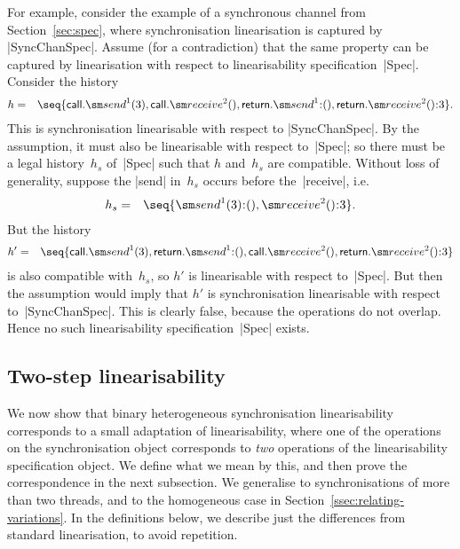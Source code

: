 For example, consider the example of a synchronous channel from
Section~\ref{sec:spec}, where synchronisation linearisation is captured by
|SyncChanSpec|.  Assume (for a contradiction) that the same property can be
captured by linearisation with respect to linearisability
specification~|Spec|.  Consider the history
\begin{eqnarray*}
h & = & \seq{ 
  \call.\send^1(3), \call.\receive^2(), 
  \return.\send^1\::(), \return.\receive^2()\::3 }.
\end{eqnarray*}
%
This is synchronisation linearisable with respect to |SyncChanSpec|.  By the
assumption, it must also be linearisable with respect to~|Spec|; so there must
be a legal history~$h_s$ of~|Spec| such that $h$ and~$h_s$ are compatible.
Without loss of generality, suppose the |send| in~$h_s$ occurs before
the~|receive|, i.e.
\begin{eqnarray*}
h_s & = & \seq{ \send^1(3)\::(), \receive^2()\::3 }.
\end{eqnarray*}
%
But the history
%
\begin{eqnarray*}
h' & = & \seq{ 
  \call.\send^1(3), \return.\send^1\::(), 
  \call.\receive^2(), \return.\receive^2()\::3 }
\end{eqnarray*}
%
is also compatible with~$h_s$, so $h'$ is linearisable with respect to~|Spec|.
But then the assumption would imply that $h'$ is synchronisation linearisable
with respect to~|SyncChanSpec|.  This is clearly false, because the operations
do not overlap.  Hence no such linearisability specification~|Spec| exists.



\subsection{Two-step linearisability}


We now show that binary heterogeneous synchronisation linearisability
corresponds to a small adaptation of linearisability, where one of the
operations on the synchronisation object corresponds to \emph{two} operations
of the linearisability specification object.  We define what we mean by this,
and then prove the correspondence in the next subsection.  We generalise to
synchronisations of more than two threads, and to the homogeneous case in
Section~\ref{ssec:relating-variations}.  In the definitions below, we describe
just the differences from standard linearisation, to avoid repetition.

